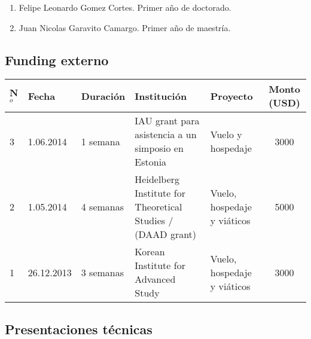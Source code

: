 \documentclass{article}
\begin{document}
\begin{enumerate}
\item{Felipe Leonardo Gomez Cortes. Primer a\~no de doctorado.}

\item{Juan Nicolas Garavito Camargo. Primer a\~no de maestr\'ia.}
\end{enumerate}

\subsection{Funding externo}
\begin{tabular}{l l l p{3.5cm} p{2.3cm} c}\hline
N$^{o}$ & Fecha & Duraci\'on & Instituci\'on & Proyecto & Monto (USD)\\\hline
3 & 1.06.2014 & 1 semana & IAU grant para asistencia a un simposio en
Estonia & Vuelo y hospedaje & 3000\\\hline
2 & 1.05.2014 & 4 semanas & Heidelberg Institute for Theoretical
Studies / (DAAD grant) & Vuelo, hospedaje y vi\'aticos & 5000\\\hline
1 & 26.12.2013 & 3 semanas & Korean Institute for Advanced Study &
Vuelo, hospedaje y vi\'aticos & 3000\\\hline
\end{tabular}

\subsection{Presentaciones t\'ecnicas}
\end{document}
